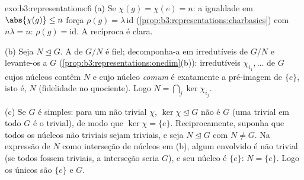 \begin{solution}{exo:b3:representations:6}
(a) Se $\chi(g) = \chi(e) = n$: a igualdade em
$\abs{\chi(g)} \leq n$ força $\rho(g) = \lambda\,\mathrm{id}$
(\cref{prop:b3:representations:charbasics}) com $n\lambda = n$:
$\rho(g) = \mathrm{id}$. A recíproca é clara.

(b) Seja $N \trianglelefteq G$. A  de
$G/N$ é fiel; decomponha-a em irredutíveis de $G/N$ e
levante-os a $G$ (\cref{prop:b3:representations:onedim}(b)):
 irredutíveis $\chi_{i_1}, \dots$ de $G$ cujos núcleos
contêm $N$ e cujo núcleo \emph{comum} é exatamente a
pré-imagem de $\{e\}$, isto é, $N$ (fidelidade no quociente).
Logo $N = \bigcap_j \ker\chi_{i_j}$.

(c) Se $G$ é simples: para um  não trivial $\chi$,
$\ker\chi \trianglelefteq G$ não é $G$ (uma  trivial em todo $G$ é o  trivial),
de modo que $\ker\chi = \{e\}$. Reciprocamente, suponha que todos os
núcleos não triviais sejam triviais, e seja $N \trianglelefteq G$ com $N \neq
G$. Na expressão de $N$ como interseção de núcleos em (b),
algum  envolvido é não trivial (se todos fossem triviais, a
interseção seria $G$), e seu núcleo é $\{e\}$: $N =
\{e\}$. Logo os únicos  são $\{e\}$ e $G$.
\end{solution}

